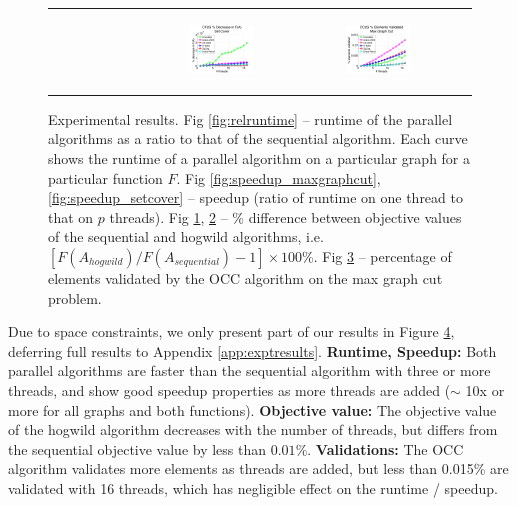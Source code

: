 \documentclass{article} %
\begin{document}
\begin{figure}[ht]
\begin{tabular}{cccc}
\begin{subfigure}[h]{0.30\textwidth}
			\caption{}
			\label{fig:difffa_maxgraphcut}
	  \end{subfigure} &
	  \begin{subfigure}[h]{0.30\textwidth}
	  	\includegraphics[width=150pt]{images/summary_diffFA_setcover.png}
			\caption{}
			\label{fig:difffa_setcover}
	  \end{subfigure} &
	  \begin{subfigure}[h]{0.30\textwidth}
	  	\includegraphics[width=150pt]{images/summary_validated_maxgraphcut.png}
			\caption{}
			\label{fig:validated_maxgraphcut}
	  \end{subfigure} \\
  \end{tabular}
  \caption{\footnotesize Experimental results.
  Fig \ref{fig:relruntime} -- runtime of the parallel algorithms as a ratio to that of the sequential algorithm. Each curve shows the runtime of a parallel algorithm on a particular graph for a particular function $F$.
  Fig \ref{fig:speedup_maxgraphcut}, \ref{fig:speedup_setcover} -- speedup (ratio of runtime on one thread to that on $p$ threads).
  Fig \ref{fig:difffa_maxgraphcut}, \ref{fig:difffa_setcover} -- \% difference between objective values of the sequential and hogwild algorithms, i.e. $[F(A_{hogwild}) / F(A_{sequential}) - 1] \times 100\%$.
  Fig \ref{fig:validated_maxgraphcut} -- percentage of elements validated by the OCC algorithm on the max graph cut problem.
  }
\label{fig:results_quality}
\end{figure}


Due to space constraints, we only present part of our results in Figure \ref{fig:results_quality}, deferring full results to Appendix \ref{app:exptresults}.
\textbf{Runtime, Speedup:} Both parallel algorithms are faster than the sequential algorithm with three or more threads, and show good speedup properties as more threads are added ($\sim$ 10x or more for all graphs and both functions).
\textbf{Objective value:} The objective value of the hogwild algorithm decreases with the number of threads, but differs from the sequential objective value by less than $0.01\%$.
\textbf{Validations:} The OCC algorithm validates more elements as threads are added, but less than 0.015\% are validated with 16 threads, which has negligible effect on the runtime / speedup.
\end{document}
